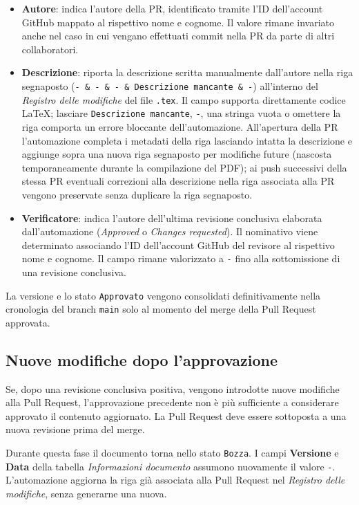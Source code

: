 \documentclass[11pt, a4paper]{article}
\begin{document}
\begin{itemize}
    \item \textbf{Autore}: indica l'autore della PR, identificato tramite l'ID dell'account GitHub mappato al rispettivo nome e cognome. Il valore rimane invariato anche nel caso in cui vengano effettuati commit nella PR da parte di altri collaboratori.

    \item \textbf{Descrizione}: riporta la descrizione scritta manualmente dall'autore nella riga segnaposto (\texttt{- \& - \& - \& Descrizione mancante \& -}) all'interno del \textit{Registro delle modifiche} del file \texttt{.tex}. Il campo supporta direttamente codice LaTeX; lasciare \texttt{Descrizione mancante}, \texttt{-}, una stringa vuota o omettere la riga comporta un errore bloccante dell'automazione. All'apertura della PR l'automazione completa i metadati della riga lasciando intatta la descrizione e aggiunge sopra una nuova riga segnaposto per modifiche future (nascosta temporaneamente durante la compilazione del PDF); ai push successivi della stessa PR eventuali correzioni alla descrizione nella riga associata alla PR vengono preservate senza duplicare la riga segnaposto.

    \item \textbf{Verificatore}: indica l'autore dell'ultima revisione conclusiva elaborata dall'automazione (\textit{Approved} o \textit{Changes requested}). Il nominativo viene determinato associando l'ID dell'account GitHub del revisore al rispettivo nome e cognome. Il campo rimane valorizzato a \texttt{-} fino alla sottomissione di una revisione conclusiva.
\end{itemize}

\noindent La versione e lo stato \texttt{Approvato} vengono consolidati definitivamente nella cronologia del branch \texttt{main} solo al momento del merge della Pull Request approvata.

\subsection{Nuove modifiche dopo l'approvazione}

Se, dopo una revisione conclusiva positiva, vengono introdotte nuove modifiche alla Pull Request, l'approvazione precedente non è più sufficiente a considerare approvato il contenuto aggiornato. La Pull Request deve essere sottoposta a una nuova revisione prima del merge.

Durante questa fase il documento torna nello stato \texttt{Bozza}. I campi \textbf{Versione} e \textbf{Data} della tabella \textit{Informazioni documento} assumono nuovamente il valore \texttt{-}. L'automazione aggiorna la riga già associata alla Pull Request nel \textit{Registro delle modifiche}, senza generarne una nuova.
\end{document}
